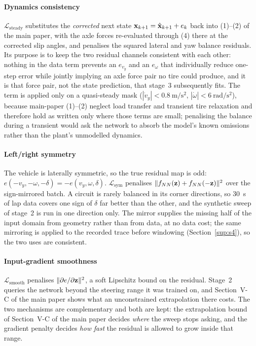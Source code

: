 \paragraph{Dynamics consistency}
$\mathcal{L}_{\mathrm{steady}}$ substitutes the \emph{corrected} next state
$\mathbf{x}_{k+1}=\hat{\mathbf{x}}_{k+1}+e_{k}$ back into
(1)--(2) of the main paper, with the axle forces re-evaluated
through (4) there at the corrected slip angles, and penalises the squared lateral
and yaw balance residuals. Its purpose is to keep the two residual channels
consistent with each other: nothing in the data term prevents an
$e_{v_{y}}$ and an $e_{\omega}$ that individually reduce one-step error while
jointly implying an axle force pair no tire could produce, and it is that force
pair, not the state prediction, that stage~3 subsequently fits. The term is
applied only on a quasi-steady mask ($|\dot v_{y}|<\SI{0.8}{\meter\per\second\squared}$,
$|\dot\omega|<\SI{6}{\radian\per\second\squared}$), because
main-paper (1)--(2) neglect load transfer and transient tire
relaxation and therefore hold as written only where those terms are small;
penalising the balance during a transient would ask the network to absorb the
model's known omissions rather than the plant's unmodelled dynamics.

\paragraph{Left/right symmetry}
The vehicle is laterally symmetric, so the true residual map is odd:
$e(-v_{y},-\omega,-\delta)=-e(v_{y},\omega,\delta)$.
$\mathcal{L}_{\mathrm{sym}}$ penalises
$\|f_{NN}(\mathbf{z})+f_{NN}(-\mathbf{z})\|^{2}$ over the sign-mirrored batch. A circuit
is rarely balanced in its corner directions, so \SI{30}{\second} of lap data
covers one sign of $\delta$ far better than the other, and the synthetic sweep
of stage~2 is run in one direction only. The mirror supplies the missing half
of the input domain from geometry rather than from data, at no data cost; the
same mirroring is applied to the recorded trace before windowing
(Section~\ref{sup:s4}), so the two uses are consistent.

\paragraph{Input-gradient smoothness}
$\mathcal{L}_{\mathrm{smooth}}$ penalises
$\|\partial e/\partial\mathbf{z}\|^{2}$, a soft Lipschitz bound on the residual.
Stage~2 queries the network beyond the steering range it was trained on, and
Section~V-C of the main paper shows what an unconstrained extrapolation there
costs. The two mechanisms are complementary and both are kept: the
extrapolation bound of Section~V-C of the main paper decides \emph{where} the
sweep stops asking, and the gradient penalty decides \emph{how fast} the
residual is allowed to grow inside that range.

